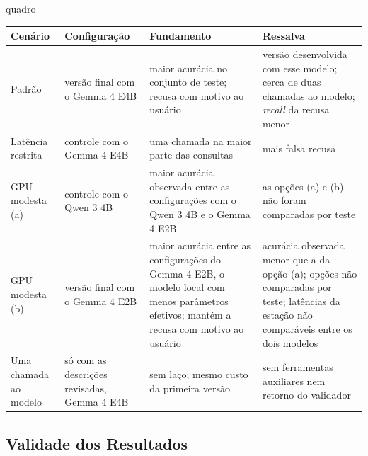 \begin{fixo}{quadro}
\centering
\caption{Configurações recomendadas por cenário de implantação}
\label{quadro:recomendacao}
\footnotesize
\begin{tabular}{|>{\raggedright\arraybackslash}p{2.2cm}|>{\raggedright\arraybackslash}p{4.0cm}|>{\raggedright\arraybackslash}p{4.0cm}|>{\raggedright\arraybackslash}p{4.0cm}|}
\hline
\textbf{Cenário} & \textbf{Configuração} & \textbf{Fundamento} & \textbf{Ressalva} \\ \hline
Padrão & versão final com o Gemma 4 E4B & maior acurácia no conjunto de teste; recusa com motivo ao usuário & versão desenvolvida com esse modelo; cerca de duas chamadas ao modelo; \textit{recall} da recusa menor \\ \hline
Latência restrita & controle com o Gemma 4 E4B & uma chamada na maior parte das consultas & mais falsa recusa \\ \hline
GPU modesta (a) & controle com o Qwen 3 4B & maior acurácia observada entre as configurações com o Qwen 3 4B e o Gemma 4 E2B & as opções (a) e (b) não foram comparadas por teste \\ \hline
GPU modesta (b) & versão final com o Gemma 4 E2B & maior acurácia entre as configurações do Gemma 4 E2B, o modelo local com menos parâmetros efetivos; mantém a recusa com motivo ao usuário & acurácia observada menor que a da opção (a); opções não comparadas por teste; latências da estação não comparáveis entre os dois modelos \\ \hline
Uma chamada ao modelo & só com as descrições revisadas, Gemma 4 E4B & sem laço; mesmo custo da primeira versão & sem ferramentas auxiliares nem retorno do validador \\ \hline
\end{tabular}
\end{fixo}

\subsection{Validade dos Resultados}
\label{sec:validade}

